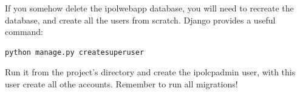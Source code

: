 If you somehow delete the ipolwebapp database, you will need to recreate the database, and create all the users from scratch. Django provides a useful command: 

\begin{lstlisting}[language=Python,firstnumber=1]
python manage.py createsuperuser
\end{lstlisting}

Run it from the project's directory and create the ipolcpadmin user, 
with this user create all othe accounts.
Remember to run all migrations!




